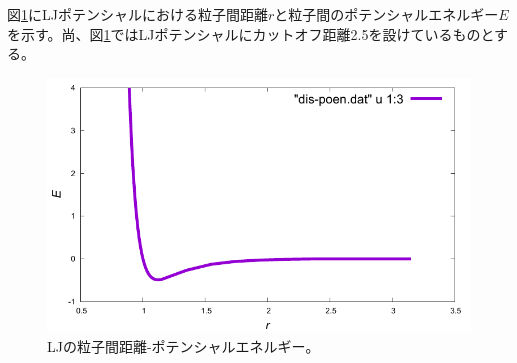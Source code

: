 \documentclass[titlepage]{jsreport}
\begin{document}
図\ref{fig:dis-poen}にLJポテンシャルにおける粒子間距離$r$と粒子間のポテンシャルエネルギー$E$を示す。尚、図\ref{fig:dis-poen}ではLJポテンシャルにカットオフ距離2.5を設けているものとする。

\begin{figure}[htbp]
    \begin{center}
        \includegraphics[width=14cm]{fig/dis-poen/dis-poen.pdf}
    \end{center}
    \caption{LJの粒子間距離-ポテンシャルエネルギー。}
    \label{fig:dis-poen}
\end{figure}

\end{document}
